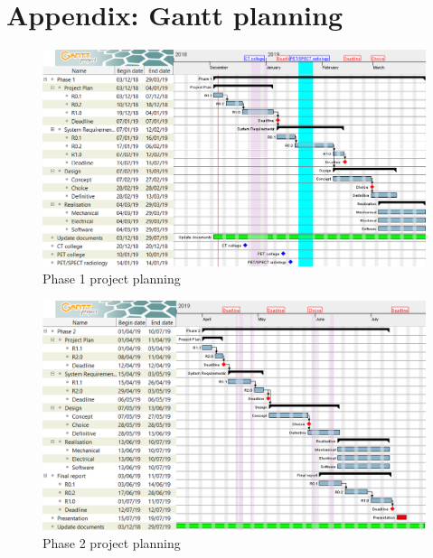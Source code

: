 \chapter{Appendix: Gantt planning} \label{app:ganttplan}
\begin{figure}[h!t]
	\begin{center}
		\includegraphics[width=\textwidth]{images/plan_phase1.png}
	\end{center}
	\caption{Phase 1 project planning}
	\label{fig:plan_phase1}
\end{figure}

\begin{figure}[h!t]
	\begin{center}
		\includegraphics[width=\textwidth]{images/plan_phase2.png}
	\end{center}
	\caption{Phase 2 project planning}
	\label{fig:plan_phase2}
\end{figure}

